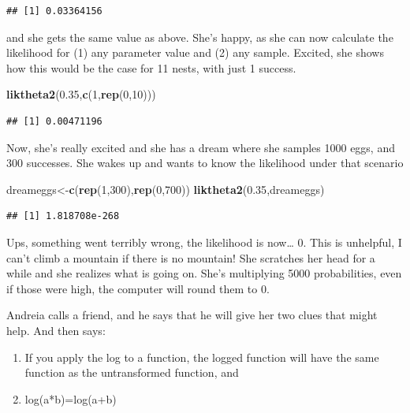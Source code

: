 \documentclass[
]{book}
\newenvironment{Shaded}{\begin{snugshade}}{\end{snugshade}}
\newcommand{\DecValTok}[1]{\textcolor[rgb]{0.00,0.00,0.81}{#1}}
\newcommand{\FloatTok}[1]{\textcolor[rgb]{0.00,0.00,0.81}{#1}}
\newcommand{\KeywordTok}[1]{\textcolor[rgb]{0.13,0.29,0.53}{\textbf{#1}}}
\newcommand{\NormalTok}[1]{#1}
\begin{document}
\begin{verbatim}
## [1] 0.03364156
\end{verbatim}

and she gets the same value as above. She's happy, as she can now calculate the likelihood for (1) any parameter value and (2) any sample. Excited, she shows how this would be the case for 11 nests, with just 1 success.

\begin{Shaded}
\begin{Highlighting}[]
\KeywordTok{liktheta2}\NormalTok{(}\FloatTok{0.35}\NormalTok{,}\KeywordTok{c}\NormalTok{(}\DecValTok{1}\NormalTok{,}\KeywordTok{rep}\NormalTok{(}\DecValTok{0}\NormalTok{,}\DecValTok{10}\NormalTok{)))}
\end{Highlighting}
\end{Shaded}

\begin{verbatim}
## [1] 0.00471196
\end{verbatim}

Now, she's really excited and she has a dream where she samples 1000 eggs, and 300 successes. She wakes up and wants to know the likelihood under that scenario

\begin{Shaded}
\begin{Highlighting}[]
\NormalTok{dreameggs<-}\KeywordTok{c}\NormalTok{(}\KeywordTok{rep}\NormalTok{(}\DecValTok{1}\NormalTok{,}\DecValTok{300}\NormalTok{),}\KeywordTok{rep}\NormalTok{(}\DecValTok{0}\NormalTok{,}\DecValTok{700}\NormalTok{))}
\KeywordTok{liktheta2}\NormalTok{(}\FloatTok{0.35}\NormalTok{,dreameggs)}
\end{Highlighting}
\end{Shaded}

\begin{verbatim}
## [1] 1.818708e-268
\end{verbatim}

Ups, something went terribly wrong, the likelihood is now\ldots{} 0. This is unhelpful, I can't climb a mountain if there is no mountain! She scratches her head for a while and she realizes what is going on. She's multiplying 5000 probabilities, even if those were high, the computer will round them to 0.

Andreia calls a friend, and he says that he will give her two clues that might help. And then says:

\begin{enumerate}
\def\labelenumi{\arabic{enumi}.}
\item
  If you apply the log to a function, the logged function will have the same function as the untransformed function, and
\item
  log(a*b)=log(a+b)
\end{enumerate}
\end{document}
